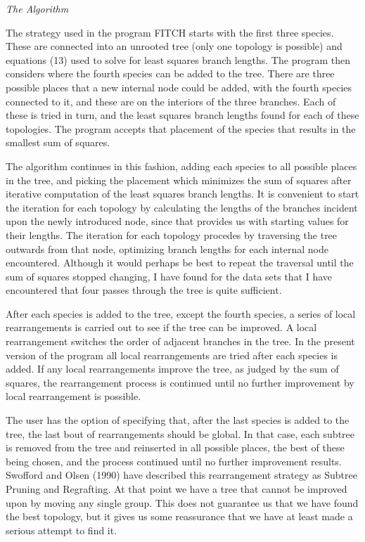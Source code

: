 \documentclass[12pt]{article}
\begin{document}
\centerline{\it The Algorithm}
\bigskip

The strategy used in the program FITCH starts with the first three
species.  These are connected into an unrooted tree (only one topology is
possible) and equations (13) used to solve for least squares branch lengths.
The program then considers where the fourth species can be added to the
tree.  There are three possible places that a new internal node could be
added, with the fourth species connected to it, and these are on the 
interiors of the three branches.  Each of these is tried in turn, and the
least squares branch lengths found for each of these topologies.
The program accepts
that placement of the species that results in the smallest sum of squares.

The algorithm continues in this fashion, adding each species to all possible
places in the tree, and picking the placement which minimizes the sum of
squares after iterative computation of the least squares branch lengths.
It is convenient to start the iteration for each topology by calculating the
lengths of the branches incident upon the newly introduced node, since that
provides us with starting values for their lengths.  The iteration for each
topology procedes by traversing the tree outwards from that node, optimizing 
branch lengths for each internal node encountered.  Although it would perhaps 
be best to repeat the traversal until the sum of squares stopped changing, I 
have found for the data sets that I have encountered that four passes through 
the tree is quite sufficient.

After each species is added to the tree, except the fourth species, a series
of local rearrangements is carried out to see if the tree can be improved.
A local rearrangement switches the
order of adjacent branches in the tree.  In the present version of
the program all local rearrangements are tried after each species is added.
If any local rearrangements improve the tree, as judged by the sum of
squares, the rearrangement process is continued until no further improvement
by local rearrangement is possible.

The user has the option of specifying that, after the last species is added to
the tree,
the last bout of rearrangements should be global.  In that case,
each subtree is removed from the tree and reinserted in all possible places,
the best of these being chosen, and the process continued until no further
improvement results.  Swofford and Olsen (1990) have described this
rearrangement strategy as Subtree Pruning and Regrafting.  At that point we have a tree that cannot be improved
upon by moving any single group.  This does not guarantee us that we have
found the best topology, but it gives us some reassurance that we have at
least made a serious attempt to find it.  
\end{document}
